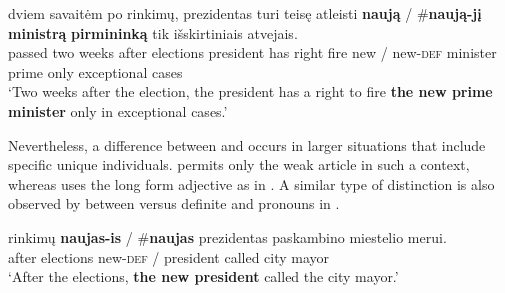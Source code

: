 \documentclass[output=paper,
modfonts
]{langscibook}
\begin{document}
\begin{exe}
\ex\label{ex:sereikaite:3}
 {dviem} {savaitėm} {po} {rinkimų}, {prezidentas} {turi} {teisę} {atleisti} \textbf{naują} \textnormal{/} \textnormal{\#}\textbf{naują-jį} \textbf{ministrą} \textbf{{pirmininką}} {tik} {išskirtiniais} {atvejais}.\\
passed two weeks after elections president has right fire new / \phantom{\#}new-\textsc{def} {minister} {prime} only exceptional cases\\
\trans `Two weeks after the election, the president has a right to fire \textbf{the new prime minister} only in exceptional cases.' 
\end{exe}

Nevertheless, a difference between  and  occurs in larger situations that include specific unique individuals.  permits only the weak article in such a context, whereas  uses the long form adjective as in . A similar type of distinction is also observed by \citet{Jenks2015} between  versus definite  and pronouns in .\largerpage[2]

\begin{exe} 
\ex \label{ex:sereikaite:4} 
 {rinkimų} \textbf{naujas-is} \textnormal{/} \textnormal{\#}\textbf{naujas} {prezidentas} {paskambino} {miestelio} {merui}.\\
after elections \phantom{\#}new-\textsc{def} / \phantom{\#}{new} president called city mayor\\
\trans `After the elections, \textbf{the new president} called the city mayor.' 
\end{exe}
\end{document}
